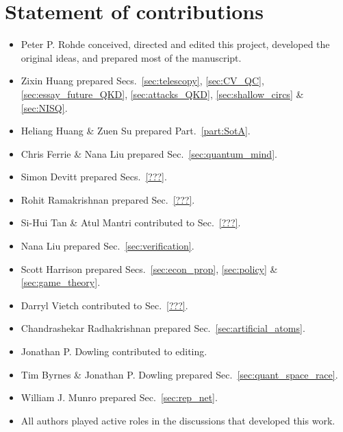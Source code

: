 %
%

\section*{Statement of contributions}

\begin{itemize}
	\item Peter P. Rohde conceived, directed and edited this project, developed the original ideas, and prepared most of the manuscript.
	\item Zixin Huang prepared Secs.~\ref{sec:telescopy}, \ref{sec:CV_QC}, \ref{sec:essay_future_QKD}, \ref{sec:attacks_QKD}, \ref{sec:shallow_circs} \& \ref{sec:NISQ}.
	\item Heliang Huang \& Zuen Su prepared Part.~\ref{part:SotA}.
	\item Chris Ferrie \& Nana Liu prepared Sec.~\ref{sec:quantum_mind}.
	\item Simon Devitt prepared Secs.~\ref{???}.
	\item Rohit Ramakrishnan prepared Sec.~\ref{???}.
	\item Si-Hui Tan \& Atul Mantri contributed to Sec.~\ref{???}.
	\item Nana Liu prepared Sec.~\ref{sec:verification}.
	\item Scott Harrison prepared Secs.~\ref{sec:econ_prop}, \ref{sec:policy} \& \ref{sec:game_theory}.
	\item Darryl Vietch contributed to Sec.~\ref{???}.
	\item Chandrashekar Radhakrishnan prepared Sec.~\ref{sec:artificial_atoms}.
	\item Jonathan P. Dowling contributed to editing.
	\item Tim Byrnes \& Jonathan P. Dowling prepared Sec.~\ref{sec:quant_space_race}.
	\item William J. Munro prepared Sec.~\ref{sec:rep_net}. 
	\item All authors played active roles in the discussions that developed this work. 
\end{itemize}
